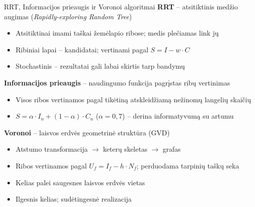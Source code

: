 \documentclass[12pt]{beamer}
\begin{document}
\begin{frame}{RRT, Informacijos prieaugis ir Voronoi algoritmai}
    \small
    \textbf{RRT} -- atsitiktinis medžio augimas (\textit{Rapidly-exploring Random Tree})
    \begin{itemize}
        \item Atsitiktinai imami taškai žemėlapio ribose; medis plečiamas link jų
        \item Ribiniai lapai -- kandidatai; vertinami pagal $S = I - w \cdot C$
        \item[--] Stochastinis -- rezultatai gali labai skirtis tarp bandymų
    \end{itemize}

    \vspace{0.2cm}
    \textbf{Informacijos prieaugis} -- naudingumo funkcija pagrįstas ribų vertinimas
    \begin{itemize}
        \item Visos ribos vertinamos pagal tikėtiną atskleidžiamą nežinomų langelių skaičių
        \item $S = \alpha \cdot I_n + (1-\alpha) \cdot C_n$ \quad ($\alpha = 0{,}7$) -- derina informatyvumą su artumu
    \end{itemize}

    \vspace{0.2cm}
    \textbf{Voronoi} -- laisvos erdvės geometrinė struktūra (GVD)
    \begin{itemize}
        \item Atstumo transformacija $\rightarrow$ keterų skeletas $\rightarrow$ grafas
        \item Ribos vertinamos pagal $U_f = I_f - h \cdot N_f$; perduodama tarpinių taškų seka
        \item[+] Kelias palei saugesnes laisvos erdvės vietas
        \item[--] Ilgesnis kelias; sudėtingesnė realizacija
    \end{itemize}
\end{frame}
\end{document}
